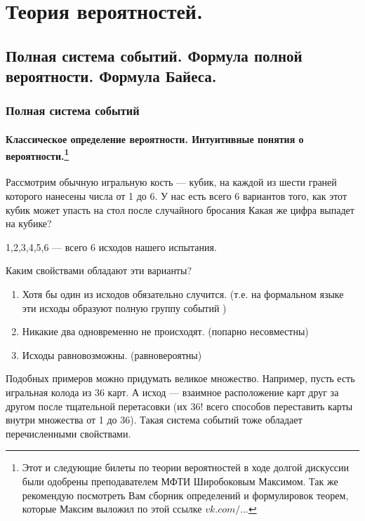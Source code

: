\part[Теория вероятностей.]{Теория вероятностей.}%

\chapter{Полная система событий. Формула полной вероятности. Формула Байеса.}
\section{Полная система событий}

\subsection[Классическое определение вероятности. Интуитивные понятия о вероятности.]{Классическое определение вероятности. Интуитивные понятия о вероятности.\protect\footnote{Этот и следующие билеты по теории вероятностей в ходе долгой дискуссии были одобрены преподавателем МФТИ Широбоковым Максимом. Так же рекомендую посмотреть Вам сборник определений и формулировок теорем, которые Максим выложил по этой ссылке \href{https://vk.com/shmaxg?w=wall5284431_903}{$vk.com/...$}}}

Рассмотрим обычную игральную кость --- кубик, на каждой из шести граней которого нанесены числа от 1 до 6. У нас есть всего 6 вариантов того, как этот кубик может упасть на стол после случайного бросания Какая же цифра выпадет на кубике? 
\begin{center}
1,2,3,4,5,6 --- всего 6 исходов нашего испытания.
\end{center}
Каким свойствами обладают эти варианты?
\begin{enumerate}
\item Хотя бы один из исходов обязательно случится. (т.е. на формальном языке эти исходы образуют полную группу событий )
\item Никакие два одновременно не происходят. (попарно несовместны)
\item Исходы равновозможны. (равновероятны)
\end{enumerate}

Подобных примеров можно придумать великое множество. Например, пусть есть игральная колода из 36 карт. А исход --- взаимное расположение карт друг за другом после тщательной перетасовки (их 36! всего способов переставить карты внутри множества от 1 до 36). Такая система событий тоже обладает перечисленными свойствами.

